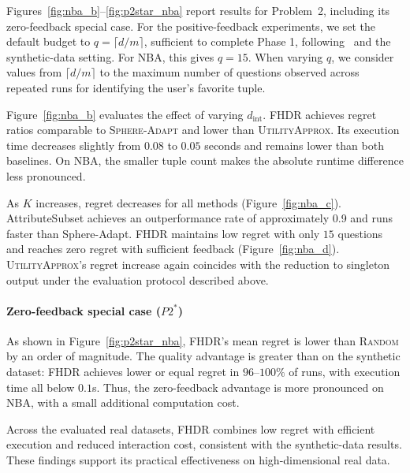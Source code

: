 Figures~\ref{fig:nba_b}--\ref{fig:p2star_nba} report results for Problem~2, including its zero-feedback special case. For the positive-feedback experiments, we set the default budget to $q=\lceil d/m\rceil$, sufficient to complete Phase 1, following~\cite{LA24} and the synthetic-data setting. For NBA, this gives $q=15$. When varying $q$, we consider values from $\lceil d/m\rceil$ to the maximum number of questions observed across repeated runs for identifying the user’s favorite tuple.

Figure~\ref{fig:nba_b} evaluates the effect of varying $d_{\text{int}}$. \textsc{FHDR} achieves regret ratios comparable to \textsc{Sphere-Adapt} and lower than \textsc{UtilityApprox}. Its execution time decreases slightly from $0.08$ to $0.05$ seconds and remains lower than both baselines. On NBA, the smaller tuple count makes the absolute runtime difference less pronounced.

As \(K\) increases, regret decreases for all methods (Figure~\ref{fig:nba_c}). AttributeSubset achieves an outperformance rate of approximately 0.9 and runs faster than Sphere-Adapt. FHDR maintains low regret with only $15$ questions and reaches zero regret with sufficient feedback (Figure~\ref{fig:nba_d}). \textsc{UtilityApprox}'s regret increase again coincides with the reduction to singleton output under the evaluation protocol described above.

\paragraph*{Zero-feedback special case ($P2^{*}$)}
As shown in Figure~\ref{fig:p2star_nba}, FHDR’s mean regret is lower than \textsc{Random} by an order of magnitude. The quality advantage is greater than on the synthetic dataset: FHDR achieves lower or equal regret in $96$--$100\%$ of runs, with execution time all below $0.1$s. Thus, the zero-feedback advantage is more pronounced on NBA, with a small additional computation cost.

Across the evaluated real datasets, FHDR combines low regret with efficient execution and reduced interaction cost, consistent with the synthetic-data results. These findings support its practical effectiveness on high-dimensional real data.

